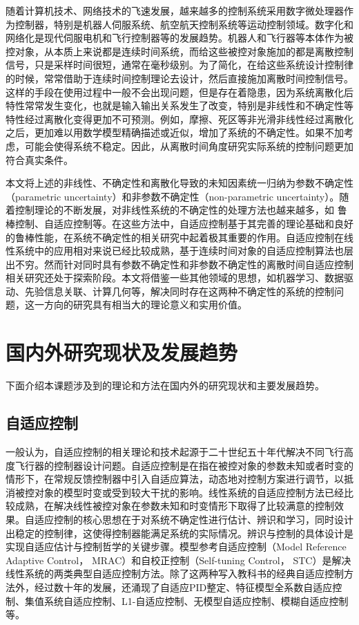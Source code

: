 随着计算机技术、网络技术的飞速发展，越来越多的控制系统采用数字微处理器作为控制器，特别是机器人伺服系统、航空航天控制系统等运动控制领域。数字化和网络化是现代伺服电机和飞行控制器等的发展趋势。机器人和飞行器等本体作为被控对象，从本质上来说都是连续时间系统，而给这些被控对象施加的都是离散控制信号，只是采样时间很短，通常在毫秒级别。为了简化，在给这些系统设计控制律的时候，常常借助于连续时间控制理论去设计，然后直接施加离散时间控制信号。这样的手段在使用过程中一般不会出现问题，但是存在着隐患，因为系统离散化后特性常常发生变化，也就是输入输出关系发生了改变，特别是非线性和不确定性等特性经过离散化变得更加不可预测。例如，摩擦、死区等非光滑非线性经过离散化之后，更加难以用数学模型精确描述或近似，增加了系统的不确定性。如果不加考虑，可能会使得系统不稳定。因此，从离散时间角度研究实际系统的控制问题更加符合真实条件。

本文将上述的非线性、不确定性和离散化导致的未知因素统一归纳为参数不确定性（parametric uncertainty）和非参数不确定性（non-parametric uncertainty）。随着控制理论的不断发展，对非线性系统的不确定性的处理方法也越来越多，如 鲁棒控制、自适应控制等。在这些方法中，自适应控制基于其完善的理论基础和良好的鲁棒性能，在系统不确定性的相关研究中起着极其重要的作用。自适应控制在线性系统中的应用相对来说已经比较成熟，基于连续时间对象的自适应控制算法也层出不穷。然而针对同时具有参数不确定性和非参数不确定性的离散时间自适应控制相关研究还处于探索阶段。本文将借鉴一些其他领域的思想，如机器学习、数据驱动、先验信息关联、计算几何等，解决同时存在这两种不确定性的系统的控制问题，这一方向的研究具有相当大的理论意义和实用价值。

\section{国内外研究现状及发展趋势}\label{sect:1.2}
下面介绍本课题涉及到的理论和方法在国内外的研究现状和主要发展趋势。
\subsection{自适应控制}%

一般认为，自适应控制的相关理论和技术起源于二十世纪五十年代解决不同飞行高度飞行器的控制器设计问题。自适应控制是在指在被控对象的参数未知或者时变的情形下，在常规反馈控制器中引入自适应算法，动态地对控制方案进行调节，以抵消被控对象的模型时变或受到较大干扰的影响。线性系统的自适应控制方法已经比较成熟，在解决线性被控对象在参数未知和时变情形下取得了比较满意的控制效果。自适应控制的核心思想在于对系统不确定性进行估计、辨识和学习，同时设计出稳定的控制律，这使得控制器能满足系统的实际情况。辨识与控制的具体设计是实现自适应估计与控制哲学的关键步骤。模型参考自适应控制（Model Reference Adaptive Control， MRAC）和自校正控制（Self-tuning Control， STC）是解决线性系统的两类典型自适应控制方法。除了这两种写入教科书的经典自适应控制方法外，经过数十年的发展，还涌现了自适应PID整定、特征模型全系数自适应控制、集值系统自适应控制、L1-自适应控制、无模型自适应控制、模糊自适应控制等。

